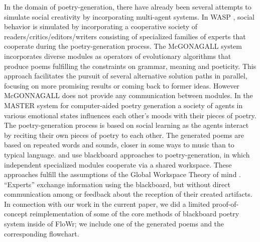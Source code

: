 In the domain of poetry-generation, there have already been several attempts to simulate social creativity by incorporating multi-agent systems. 
%
In WASP \cite{gervas10}, social behavior is simulated by incorporating a cooperative society of readers/critics/editors/writers consisting of specialized families of experts that cooperate during the poetry-generation process.
%
The McGONAGALL system \cite{manurung12} incorporates diverse modules as operators of evolutionary algorithms that produce poems fulfilling the constraints on grammar, meaning and poeticity.  This approach facilitates the pursuit of several alternative solution paths in parallel, focusing on more promising results or coming back to former ideas. However McGONNAGALL does not provide any communication between modules.
%
In the MASTER system for computer-aided poetry generation \cite{kirke13} a society of agents in various emotional states influences each other's moods with their pieces of poetry. The poetry-generation process is based on social learning as the agents interact by reciting their own pieces of poetry to each other. The generated poems are based on repeated words and sounds, closer in some ways to music than to typical language.
%
\citet{misztal2014poetry} and \citet{slant13} use blackboard approaches to poetry-generation, in which independent specialized modules cooperate via a shared workspace. These approaches fulfill the assumptions of the Global Workspace Theory of mind  \cite{baars97}. ``Experts'' exchange information using the blackboard, but without direct communication among or feedback about the reception of their created artifacts. In connection with our work in the current paper, we did a limited proof-of-concept reimplementation of some of the core methods of blackboard poetry system inside of FloWr; we include one of the generated poems and the corresponding flowchart. 



